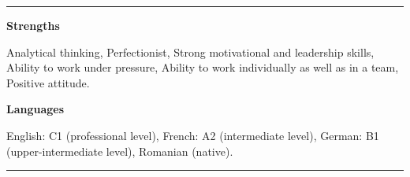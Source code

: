 \documentclass[a4paper,10pt]{article}
\newlength{\cvcolumngapwidth}
\newlength{\cvleftcolumnwidth}
\newlength{\cvrightcolumnwidth}
\newcommand{\cvsectionstyle}[1]{{\large\cvsectionfont\textcolor{cvsectioncolor}{#1}}}
\newcommand{\cvheadingstyle}[1]{{\cvheadingfont\textcolor{cvheadingcolor}{#1}}}
\newlength{\cvafteritemskipamount}
\newlength{\cvaftersectionskipamount}
\newlength{\cvbetweensectionandheadingextraskipamount}
\newlength{\cvparskip}
\newcommand{\cvsection}[1]{
    \begin{minipage}[t]{\cvleftcolumnwidth}
        \raggedleft\cvsectionstyle{#1}
    \end{minipage}%
    \hspace{\cvcolumngapwidth}%
    \begin{minipage}[t]{\cvrightcolumnwidth}
        \textcolor{cvrulecolor}{\rule{\cvrightcolumnwidth}{0.3mm}}
    \end{minipage}

    \vspace{\cvaftersectionskipamount}
}
\newcommand{\cvitem}[2]{
    \begin{minipage}[t]{\cvleftcolumnwidth}
        \raggedleft #1
    \end{minipage}%
    \hspace{\cvcolumngapwidth}%
    \begin{minipage}[t]{\cvrightcolumnwidth}
        \setlength{\parskip}{\cvparskip} #2
    \end{minipage}

    \vspace{\cvafteritemskipamount}
}
\begin{document}


\cvsection{Personal and linguistic skills}

\vspace{\cvbetweensectionandheadingextraskipamount}

\cvitem{
    \cvheadingstyle{\textbf{Strengths}}
}{Analytical thinking, Perfectionist, Strong motivational and leadership skills, Ability to work under pressure, Ability to work individually as well as in a team, Positive attitude.
}


\cvitem{
    \cvheadingstyle{\textbf{Languages}}
}{ English: C1 (professional level), French: A2 (intermediate level), German: B1 (upper-intermediate level), Romanian (native).
}


\cvsection{Honors/Awards}
\end{document}
